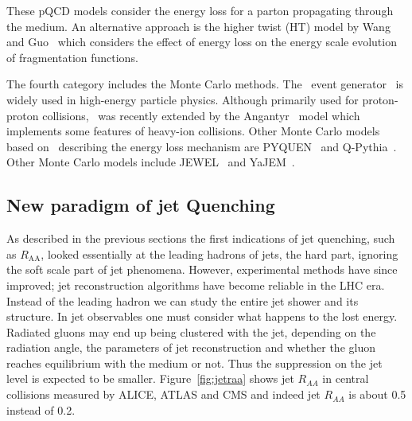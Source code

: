 These pQCD models consider the energy loss for a parton propagating through the medium. An alternative approach is the higher twist (HT) model by Wang and Guo~\cite{Wang:2001ifa} which considers the effect of energy loss on the energy scale evolution of fragmentation functions.

The fourth category includes the Monte Carlo methods. The \pythia~event generator~\cite{pythia} is widely used in high-energy particle physics. Although primarily used for proton-proton collisions, \pythia~was recently extended by the Angantyr~\cite{Bierlich:2018xfw} model which implements some features of heavy-ion collisions. Other Monte Carlo models based on \pythia~describing the energy loss mechanism are PYQUEN~\cite{Lokhtin:2005px} and Q-Pythia~\cite{Armesto:2009zc}. Other Monte Carlo models include JEWEL~\cite{Zapp:2008gi} and YaJEM~\cite{Renk:2009nz}. 





\subsection{New paradigm of jet Quenching}
As described in the previous sections the first indications of jet quenching, such as $R_{\mathrm{AA}}$, looked essentially at the leading hadrons of jets, the hard part, ignoring the soft scale part of jet phenomena. However, experimental methods have since improved; jet reconstruction algorithms have become reliable in the LHC era. Instead of the leading hadron we can study the entire jet shower and its structure. In jet observables one must consider what happens to the lost energy. Radiated gluons may end up being clustered with the jet, depending on the radiation angle, the parameters of jet reconstruction and whether the gluon reaches equilibrium with the medium or not. Thus the suppression on the jet level is expected to be smaller. Figure~\ref{fig:jetraa} shows jet $R_{AA}$ in central \PbPb collisions measured by ALICE, ATLAS and CMS and indeed jet $R_{AA}$ is about 0.5 instead of 0.2. %




